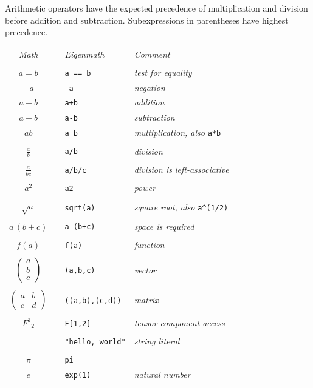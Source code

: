 \documentclass[12pt]{article}
\begin{document}
Arithmetic operators have the expected precedence of
multiplication and division before addition and subtraction.
Subexpressions in parentheses have highest precedence.

\begin{center}
\begin{tabular}{clll}
{\it Math} & & {\it Eigenmath} & {\it Comment}
\\
\\
$a=b$ & & \verb$a == b$ & {\it test for equality}
\\[1ex]
$-a$ & & {\tt -a} & {\it negation}
\\[1ex]
$a+b$ & & {\tt a+b} & {\it addition}
\\[1ex]
$a-b$ & & {\tt a-b} & {\it subtraction}
\\[1ex]
$ab$ & & {\tt a b} & {\it multiplication, also} \verb$a*b$
\\
\\
$\displaystyle\frac{a}{b}$ & & {\tt a/b} & {\it division}
\\
\\
$\displaystyle\frac{a}{bc}$ & & {\tt a/b/c} & {\it division is left-associative}
\\
\\
$a^2$ & & {\tt a{\char94}2} & {\it power}
\\
\\
$\sqrt{a}$ & & \verb$sqrt(a)$ & {\it square root, also} \verb$a^(1/2)$
\\
\\
$a\,(b+c)$ & & {\tt a (b+c)} & {\it space is required}
\\
\\
$f(a)$ & & {\tt f(a)} & {\it function}
\\
\\
$\begin{pmatrix}a\\ b\\ c\end{pmatrix}$ & & {\tt (a,b,c)} & {\it vector}
\\
\\
$\begin{pmatrix}a&b\\ c&d\end{pmatrix}$ & & {\tt ((a,b),(c,d))} & {\it matrix}
\\
\\
$F^1{}_2$ & & {\tt F[1,2]} & {\it tensor component access}
\\
\\
 & & \verb$"hello, world"$ & {\it string literal}
\\
\\
$\pi$ & & {\tt pi} &
\\[1ex]
$e$ && {\tt exp(1)} & {\it natural number}
\end{tabular}
\end{center}
\end{document}
